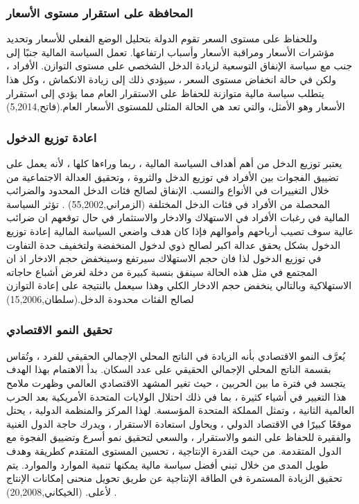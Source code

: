 \documentclass[10pt,a4paper]{report}
\begin{document}
\begin{doublespacing}
\subsubsection{المحافظة على استقرار مستوى الأسعار}
وللحفاظ على مستوى السعر تقوم الدولة بتحليل الوضع الفعلي للأسعار وتحديد مؤشرات الأسعار ومراقبة الأسعار وأسباب ارتفاعها. تعمل السياسة المالية جنبًا إلى جنب مع سياسة الإنفاق التوسعية لزيادة الدخل الشخصي على مستوى التوازن. الأفراد ، ولكن في حالة انخفاض مستوى السعر ، سيؤدي ذلك إلى زيادة الانكماش ، وكل هذا يتطلب سياسة مالية متوازنة للحفاظ على الاستقرار العام مما يؤدي إلى استقرار الأسعار وهو الأمثل، والتي تعد هي الحالة المثلى للمستوى الأسعار العام.(فاتح,5,2014)
\subsubsection{اعادة توزيع الدخول}
يعتبر توزيع الدخل من أهم أهداف السياسة المالية ، ربما وراءها كلها ، لأنه يعمل على تضييق الفجوات بين الأفراد في توزيع الدخل والثروة ، وتحقيق العدالة الاجتماعية من خلال التغييرات في الأنواع والنسب. الإنفاق لصالح فئات الدخل المحدود والضرائب المحصلة من الأفراد في فئات الدخل المختلفة (الزمراني,55,2002) . تؤثر السياسة المالية في رغبات الأفراد في الاستهلاك والادخار والاستثمار في حال توقعهم ان ضرائب عالية سوف تصيب أرباحهم وأموالهم فإذا كان هدف واضعي السياسة المالية  إعادة توزيع الدخول بشكل يحقق عدالة اكبر لصالح ذوي لدخول المنخفضة ولتخفيف حدة التفاوت في توزيع الدخول لذا فان حجم الاستهلاك سيرتفع وسينخفض حجم الادخار اذ ان المجتمع في مثل هذه الحالة سينفق بنسبة كبيرة من دخلة لغرض أشباع حاجاته الاستهلاكية وبالتالي ينخفض حجم الادخار الكلي وهذا سيعمل بالنتيجة  على إعادة التوازن لصالح الفئات محدودة الدخل.(سلطان,15,2006)
\subsubsection{تحقيق النمو الاقتصادي}
يُعرَّف النمو الاقتصادي بأنه الزيادة في الناتج المحلي الإجمالي الحقيقي للفرد ، وتُقاس بقسمة الناتج المحلي الإجمالي الحقيقي على عدد السكان. بدأ الاهتمام بهذا الهدف يتجسد في فترة ما بين الحربين ، حيث تغير المشهد الاقتصادي العالمي وظهرت ملامح هذا التغيير في أشياء كثيرة ، بما في ذلك احتلال الولايات المتحدة الأمريكية بعد الحرب العالمية الثانية ، وتمثل المملكة المتحدة المؤسسة. لهذا المركز والمنظمة الدولية ، يحتل موقعًا كبيرًا في الاقتصاد الدولي ، ويحاول استعادة الاستقرار ، ويدرك حاجة الدول الغنية والفقيرة للحفاظ على النمو والاستقرار ، والسعي لتحقيق نمو أسرع وتضييق الفجوة مع الدول المتقدمة. من حيث القدرة الإنتاجية ، تحسين المستوى المتقدم كطريقة وهدف طويل المدى من خلال تبني أفضل سياسة مالية يمكنها تنمية الموارد والموارد. يتم تحقيق الزيادة المستمرة في الطاقة الإنتاجية عن طريق تحويل منحنى إمكانات الإنتاج لأعلى. (الخيكاني,20,2008) . 


\end{doublespacing}
\end{document}
